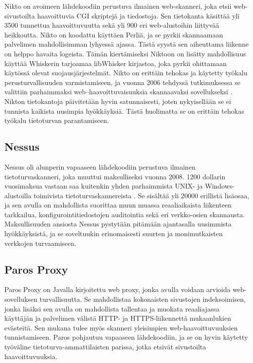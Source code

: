 Nikto \cite{Nikto} on avoimeen lähdekoodiin perustuva ilmainen web-skanneri, joka etsii web-sivustoilta haavoittuvia CGI skriptejä ja tiedostoja. Sen tietokanta käsittää
yli 3500 tunnettua haavoittuvuutta sekä yli 900 eri web-alustoihin liittyvää heikkoutta. Nikto on koodattu käyttäen Perliä, ja se pyrkii skannaamaan palvelimen 
mahdollisimman lyhyessä ajassa. Tästä syystä sen aiheuttama liikenne on helppo havaita logeista. Tämän kiertämiseksi Niktoon on lisätty mahdollisuus käyttää Whiskerin
tarjoamaa libWhisker kirjastoa, joka pyrkii ohittamaan käytössä olevat suojausjärjestelmät. Nikto on erittäin tehokas ja käytetty työkalu perusturvallisuuden 
varmistamiseen, ja vuonna 2006 tehdyssä tutkimuksessa se valittiin parhaimmaksi web--haavoittuvaisuuksia skannaavaksi sovellukseksi \cite{INS}.
Nikton tietokantoja päivitetään hyvin satunnaisesti, joten nykyisellään se ei tunnista kaikista uusimpia hyökkäyksiä. Tästä huolimatta se on erittäin tehokas työkalu 
tietoturvan parantamiseen.

\subsection{Nessus}

Nessus \cite{Nessus} oli alunperin vapaaseen lähdekoodiin perustuva ilmainen tietoturvaskanneri, joka muuttui maksulliseksi vuonna 2008. 1200 dollarin vuosimaksua vastaan
saa kuitenkin yhden parhaimmista UNIX- ja Windows-alustoilla toimivista tietoturvaskannereista \cite{NST}. Se sisältää yli 20000 erillistä lisäosaa,
ja sen avulla on mahdollista suorittaa muun muassa reaaliaikaista liikenteen tarkkailua, konfigurointitiedostojen auditointia sekä eri verkko-osien skannausta. Maksullisuuden 
ansiosta Nessus pystytään pitämään ajantasalla uusimmista hyökkäyksistä, ja se soveltuukin erinomaisesti suurten ja monimutkaisten verkkojen turvaamiseen\cite{Nessus}. 

\subsection{Paros Proxy}

Paros Proxy \cite{Paros} on Javalla kirjoitettu web proxy, jonka avulla voidaan arvioida web-sovelluksen turvallisuutta. Se mahdollistaa kokonaisten sivustojen indeksoimisen,
jonka lisäksi sen avulla on mahdollista tallentaa ja muokata reaaliajassa käyttäjän ja palvelimen välistä HTTP- ja HTTPS-liikennettä mukaanlukien evästeitä. Sen mukana tulee
myös skanneri yleisimpien web-haavoittuvuuksien tunnistamiseen. Paros pohjautuu vapaaseen lähdekoodiin, ja se on hyvin käytetty työväline tietoturva-\-ammattilaisten
parissa, jotka etsivät sivustoilta haavoittuvuuksia.

